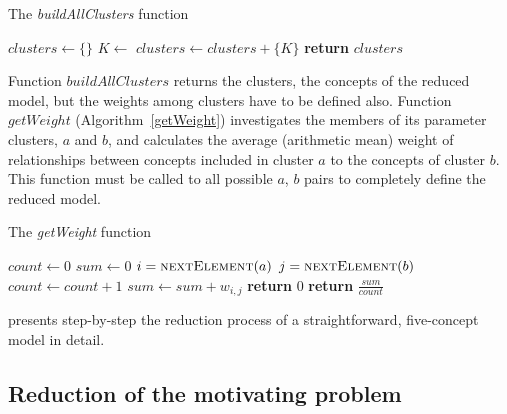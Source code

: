 \documentclass[graybox]{svmult}
\begin{document}
\begin{algorithm}
  \caption{The \emph{buildAllClusters} function}\label{buildAllClusters}
  \begin{algorithmic}[1]
      \State $clusters \gets \{\}$
        \State $K \gets$ 
          \State $clusters \gets clusters + \{K\}$
        \EndIf
      \EndFor
      \State \textbf{return} $clusters$
    \EndFunction
  \end{algorithmic}
\end{algorithm}

Function $buildAllClusters$ returns the clusters, the concepts of the reduced model, but the weights among clusters have to be defined also. Function $getWeight$ (Algorithm~\ref{getWeight}) investigates the members of its parameter clusters, $a$ and $b$, and calculates the average (arithmetic mean) weight of relationships between concepts included in cluster $a$ to the concepts of cluster $b$. This function must be called to all possible $a$, $b$ pairs to completely define the reduced model.

\begin{algorithm}
  \caption{The \emph{getWeight} function}\label{getWeight}
  \begin{algorithmic}[1]
      \State $count \gets 0$
      \State $sum \gets 0$
        \State $i = \Call{nextElement}{a}$
          \State $j = \Call{nextElement}{b}$
            \State $count \gets count + 1$
            \State $sum \gets sum + w_{i,j}$
          \EndIf
        \EndWhile
      \EndWhile
        \State \textbf{return} $0$
      \Else
        \State \textbf{return} $\frac{sum}{count}$
      \EndIf
    \EndFunction
  \end{algorithmic}
\end{algorithm}

\cite{papageorgiou2017concept} presents step-by-step the reduction 
process of a straightforward, five-concept model in detail.

\subsection{Reduction of the motivating problem}
\label{sec:reductionIWMS}
\end{document}
